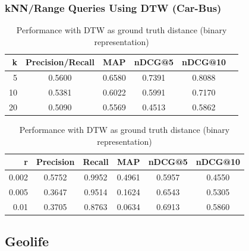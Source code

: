 \documentclass{beamer}
\begin{document}
\begin{frame}
\frametitle{kNN/Range Queries Using DTW (Car-Bus)} 
\begin{block}{} \vspace{-5mm}
\begin{table}[!htbp]
{\footnotesize
\centering
\begin{tabular}{rccccc}
 	{\bf k } 	& {\bf Precision/Recall}	&	{\bf MAP}	 & {\bf nDCG@5}	& {\bf nDCG@10} \\ \midrule
 	5   		& 	0.5600   		 	&	0.6580	 & 0.7391			& 0.8088	\\ \midrule
	10   		& 	0.5381    		 	&	0.6022	 & 0.5991			& 0.7170	\\ \midrule
 	20  		&   	0.5090   			&	0.5569	 & 0.4513  		& 0.5862	\\ \bottomrule 
\end{tabular}  \vspace{5mm}

\centering
\begin{tabular}{rccccc}
 	{\bf r } 	& {\bf Precision}& {\bf Recall}	&	{\bf MAP}	 & {\bf nDCG@5}	& {\bf nDCG@10} \\ \midrule
 	0.002   	& 	0.5752    	& 	0.9952	&	0.4961	 & 0.5957			& 0.4550	\\ \midrule
	0.005   	& 	0.3647    	& 	0.9514 	&	0.1624	 & 0.6543			& 0.5305	\\ \midrule
 	0.01 		&   	0.3705  	&      0.8763	&	0.0634	 & 0.6913  		& 0.5860	\\ \bottomrule
\end{tabular} 
\caption{\footnotesize Performance with DTW as ground truth distance (binary representation)}
\label{table: car-bus binary dtw} 
}
\end{table}
\end{block}
\end{frame}



\subsection{Geolife}
\end{document}
